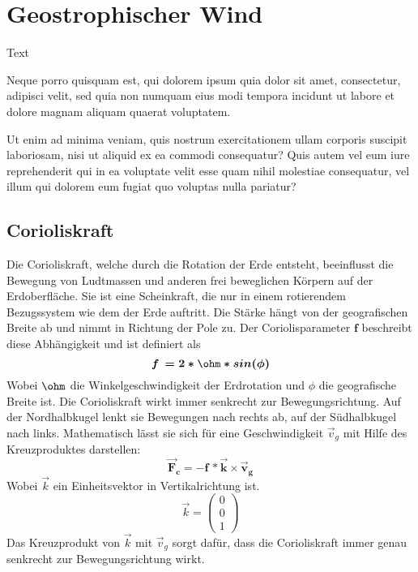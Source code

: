 %
%
%
%
\section{Geostrophischer Wind
\label{geostrophisch:section:teil1}}
Text

Neque porro quisquam est, qui dolorem ipsum quia dolor sit amet,
consectetur, adipisci velit, sed quia non numquam eius modi tempora
incidunt ut labore et dolore magnam aliquam quaerat voluptatem.

Ut enim ad minima veniam, quis nostrum exercitationem ullam corporis
suscipit laboriosam, nisi ut aliquid ex ea commodi consequatur?
Quis autem vel eum iure reprehenderit qui in ea voluptate velit
esse quam nihil molestiae consequatur, vel illum qui dolorem eum
fugiat quo voluptas nulla pariatur?






\subsection{Corioliskraft
\label{geostrophisch:subsection:finibus}}
Die Corioliskraft, welche durch die Rotation der Erde entsteht, beeinflusst die Bewegung von Ludtmassen und anderen frei beweglichen Körpern auf der Erdoberfläche. Sie ist eine Scheinkraft, die nur in einem rotierendem Bezugssystem wie dem der Erde auftritt. Die Stärke hängt von der geografischen Breite ab und nimmt in Richtung der Pole zu.
Der Coriolisparameter $\boldsymbol{f}$ beschreibt diese Abhängigkeit und ist definiert als 
\begin{equation}
\boldsymbol{
f\, 
= 
2*\ohm*sin(\phi)
}
\label{geostrophisch:equation1}
\end{equation}
Wobei $\ohm$ die Winkelgeschwindigkeit der Erdrotation und $\phi$ die geografische Breite ist.
Die Corioliskraft wirkt immer senkrecht zur Bewegungsrichtung. Auf der Nordhalbkugel lenkt sie Bewegungen nach rechts ab, auf der Südhalbkugel nach links. Mathematisch lässt sie sich für eine Geschwindigkeit $\vec{v}_g $ mit Hilfe des Kreuzproduktes darstellen:
\begin{equation}
\boldsymbol{
\vec{F}_c 
= 
-f\, *\vec{k} \times \vec{v}_g 
}
\label{geostrophisch:equation2}
\end{equation}
Wobei $\vec{k}$ ein Einheitsvektor in Vertikalrichtung ist.
\begin{equation}
\vec{k} =
\left(
\begin{array}{c}
0 \\
0 \\
1
\end{array}
\right)
\label{geostrophisch:equation4}
\end{equation}
Das Kreuzprodukt von $\vec{k}$ mit  $\vec{v}_g $ sorgt dafür, dass die Corioliskraft immer genau senkrecht zur Bewegungsrichtung wirkt.
